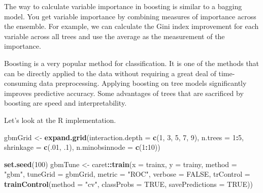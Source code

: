 \documentclass[12pt,]{krantz}
\makeatletter
\newenvironment{Shaded}{\begin{snugshade}}{\end{snugshade}}
\newcommand{\DataTypeTok}[1]{\textcolor[rgb]{0.27,0.27,0.27}{#1}}
\newcommand{\DecValTok}[1]{\textcolor[rgb]{0.06,0.06,0.06}{#1}}
\newcommand{\FloatTok}[1]{\textcolor[rgb]{0.06,0.06,0.06}{#1}}
\newcommand{\KeywordTok}[1]{\textcolor[rgb]{0.27,0.27,0.27}{\textbf{#1}}}
\newcommand{\NormalTok}[1]{#1}
\newcommand{\OperatorTok}[1]{\textcolor[rgb]{0.43,0.43,0.43}{\textbf{#1}}}
\newcommand{\OtherTok}[1]{\textcolor[rgb]{0.37,0.37,0.37}{#1}}
\newcommand{\StringTok}[1]{\textcolor[rgb]{0.5,0.5,0.5}{#1}}
\newenvironment{kframe}{%
\medskip{}
\setlength{\fboxsep}{.8em}
 \def\at@end@of@kframe{}%
 \ifinner\ifhmode%
  \def\at@end@of@kframe{\end{minipage}}%
  \begin{minipage}{\columnwidth}%
 \fi\fi%
 \def\FrameCommand##1{\hskip\@totalleftmargin \hskip-\fboxsep
 \colorbox{shadecolor}{##1}\hskip-\fboxsep
     \hskip-\linewidth \hskip-\@totalleftmargin \hskip\columnwidth}%
 \MakeFramed {\advance\hsize-\width
   \@totalleftmargin\z@ \linewidth\hsize
   \@setminipage}}%
 {\par\unskip\endMakeFramed%
 \at@end@of@kframe}
\renewenvironment{Shaded}{\begin{kframe}}{\end{kframe}}
\makeatother
\begin{document}
The way to calculate variable importance in boosting is similar to a bagging model. You get variable importance by combining measures of importance across the ensemble. For example, we can calculate the Gini index improvement for each variable across all trees and use the average as the measurement of the importance.

Boosting is a very popular method for classification. It is one of the methods that can be directly applied to the data without requiring a great deal of time-consuming data preprocessing. Applying boosting on tree models significantly improves predictive accuracy. Some advantages of trees that are sacrificed by boosting are speed and interpretability.

Let's look at the R implementation.

\begin{Shaded}
\begin{Highlighting}[]
\NormalTok{gbmGrid <-}\StringTok{ }\KeywordTok{expand.grid}\NormalTok{(}\DataTypeTok{interaction.depth =} \KeywordTok{c}\NormalTok{(}\DecValTok{1}\NormalTok{, }\DecValTok{3}\NormalTok{, }\DecValTok{5}\NormalTok{, }\DecValTok{7}\NormalTok{, }\DecValTok{9}\NormalTok{),}
                       \DataTypeTok{n.trees =} \DecValTok{1}\OperatorTok{:}\DecValTok{5}\NormalTok{,}
                       \DataTypeTok{shrinkage =} \KeywordTok{c}\NormalTok{(.}\DecValTok{01}\NormalTok{, }\FloatTok{.1}\NormalTok{),}
                       \DataTypeTok{n.minobsinnode =} \KeywordTok{c}\NormalTok{(}\DecValTok{1}\OperatorTok{:}\DecValTok{10}\NormalTok{))}

\KeywordTok{set.seed}\NormalTok{(}\DecValTok{100}\NormalTok{)}
\NormalTok{gbmTune <-}\StringTok{ }\NormalTok{caret}\OperatorTok{::}\KeywordTok{train}\NormalTok{(}\DataTypeTok{x =}\NormalTok{ trainx, }
                \DataTypeTok{y =}\NormalTok{ trainy,}
                \DataTypeTok{method =} \StringTok{"gbm"}\NormalTok{,}
                \DataTypeTok{tuneGrid =}\NormalTok{ gbmGrid,}
                \DataTypeTok{metric =} \StringTok{"ROC"}\NormalTok{,}
                \DataTypeTok{verbose =} \OtherTok{FALSE}\NormalTok{,}
                \DataTypeTok{trControl =} \KeywordTok{trainControl}\NormalTok{(}\DataTypeTok{method =} \StringTok{"cv"}\NormalTok{,}
                           \DataTypeTok{classProbs =} \OtherTok{TRUE}\NormalTok{,}
                           \DataTypeTok{savePredictions =} \OtherTok{TRUE}\NormalTok{))}
\end{Highlighting}
\end{Shaded}
\end{document}
